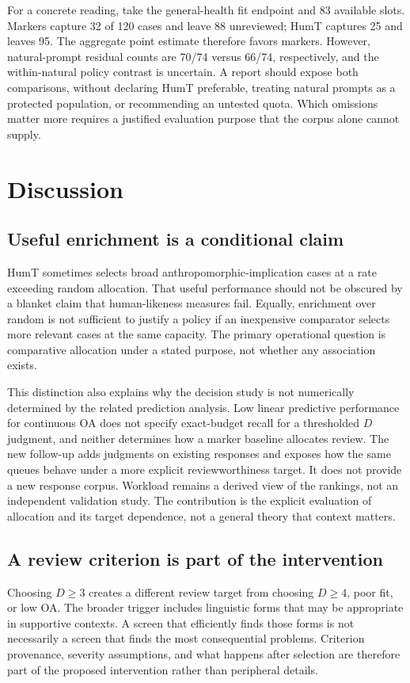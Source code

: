 \documentclass[manuscript,screen,review,anonymous]{acmart}
\begin{document}
For a concrete reading, take the general-health fit endpoint and 83 available slots. Markers capture 32 of 120 cases and leave 88 unreviewed; HumT captures 25 and leaves 95. The aggregate point estimate therefore favors markers. However, natural-prompt residual counts are 70/74 versus 66/74, respectively, and the within-natural policy contrast is uncertain. A report should expose both comparisons, without declaring HumT preferable, treating natural prompts as a protected population, or recommending an untested quota. Which omissions matter more requires a justified evaluation purpose that the corpus alone cannot supply.

\section{Discussion}
\subsection{Useful enrichment is a conditional claim}
HumT sometimes selects broad anthropomorphic-implication cases at a rate exceeding random allocation. That useful performance should not be obscured by a blanket claim that human-likeness measures fail. Equally, enrichment over random is not sufficient to justify a policy if an inexpensive comparator selects more relevant cases at the same capacity. The primary operational question is comparative allocation under a stated purpose, not whether any association exists.

This distinction also explains why the decision study is not numerically determined by the related prediction analysis. Low linear predictive performance for continuous OA does not specify exact-budget recall for a thresholded $D$ judgment, and neither determines how a marker baseline allocates review. The new follow-up adds judgments on existing responses and exposes how the same queues behave under a more explicit reviewworthiness target. It does not provide a new response corpus. Workload remains a derived view of the rankings, not an independent validation study. The contribution is the explicit evaluation of allocation and its target dependence, not a general theory that context matters.

\subsection{A review criterion is part of the intervention}
Choosing $D\geq3$ creates a different review target from choosing $D\geq4$, poor fit, or low OA. The broader trigger includes linguistic forms that may be appropriate in supportive contexts. A screen that efficiently finds those forms is not necessarily a screen that finds the most consequential problems. Criterion provenance, severity assumptions, and what happens after selection are therefore part of the proposed intervention rather than peripheral details.
\end{document}
